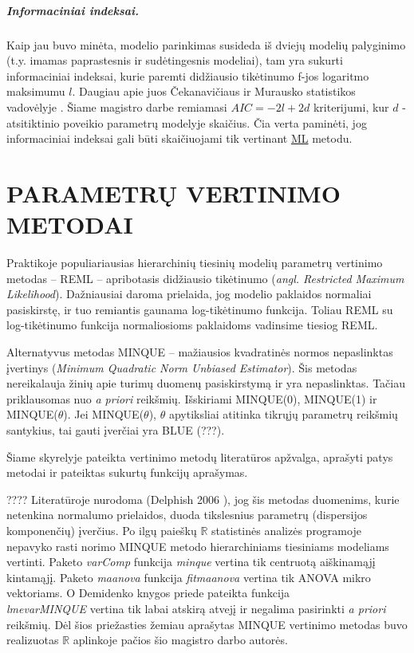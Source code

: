 \documentclass[12pt,a4paper]{article}
\newcommand{\R}{{\mathbb R}}
\begin{document}
\subparagraph{Informaciniai indeksai.} Kaip jau buvo minėta, modelio parinkimas susideda iš dviejų modelių palyginimo (t.y. imamas paprastesnis ir sudėtingesnis modeliai), tam yra sukurti informaciniai indeksai, kurie paremti didžiausio tikėtinumo f-jos logaritmo maksimumu $l$. Daugiau apie juos Čekanavičiaus ir Murausko statistikos vadovėlyje \cite{cek}. Šiame magistro darbe remiamasi $AIC=-2l+2d$ kriterijumi, kur $d$ - atsitiktinio poveikio parametrų modelyje skaičius. Čia verta paminėti, jog informaciniai indeksai gali būti skaičiuojami tik vertinant \hyperlink{reml}{ML} metodu.

\newpage
\section{PARAMETRŲ VERTINIMO METODAI} \label{sec:vert}
\indent Praktikoje populiariausias hierarchinių tiesinių modelių parametrų vertinimo metodas -- REML -- apribotasis didžiausio tikėtinumo (\textit{angl. Restricted Maximum Likelihood}). Dažniausiai daroma prielaida, jog modelio paklaidos normaliai pasiskirstę, ir tuo remiantis gaunama log-tikėtinumo funkcija. Toliau REML su log-tikėtinumo funkcija normaliosioms paklaidoms vadinsime tiesiog REML. 

\indent Alternatyvus metodas MINQUE -- mažiausios kvadratinės normos nepaslinktas įvertinys (\textit{Minimum Quadratic Norm Unbiased Estimator}). Šis metodas nereikalauja žinių apie turimų duomenų pasiskirstymą ir yra nepaslinktas. Tačiau priklausomas nuo \textit{a priori} reikšmių. Išskiriami MINQUE(0), MINQUE(1) ir MINQUE($\theta$). Jei MINQUE($\theta$), $\theta$ apytiksliai atitinka tikrųjų parametrų reikšmių santykius, tai gauti įverčiai yra BLUE (???).

\indent Šiame skyrelyje pateikta vertinimo metodų literatūros apžvalga, aprašyti patys metodai ir pateiktas sukurtų funkcijų aprašymas.


???? Literatūroje nurodoma (Delphish 2006 \cite{delpish}), jog šis metodas duomenims, kurie netenkina normalumo prielaidos, duoda tikslesnius parametrų (dispersijos komponenčių) įverčius. Po ilgų paieškų $\R$ statistinės analizės programoje nepavyko rasti norimo MINQUE metodo hierarchiniams tiesiniams modeliams vertinti. Paketo \textit{varComp} funkcija \textit{minque} vertina tik centruotą aiškinamąjį kintamąjį. Paketo \textit{maanova} funkcija \textit{fitmaanova} vertina tik ANOVA mikro vektoriams. O Demidenko knygos \cite{mixedR} priede pateikta funkcija\\ \textit{lmevarMINQUE} vertina tik labai atskirą atvejį ir negalima pasirinkti \textit{a priori} reikšmių. Dėl šios priežasties žemiau aprašytas MINQUE vertinimo metodas buvo realizuotas $\R$ aplinkoje pačios šio magistro darbo autorės.
\end{document}
